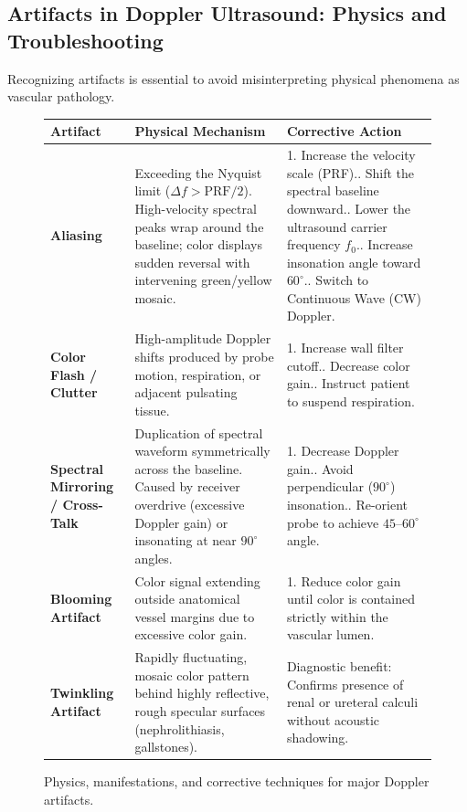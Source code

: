 \documentclass[11pt,a4paper]{article}
\begin{document}
\subsection{Artifacts in Doppler Ultrasound: Physics and Troubleshooting}

Recognizing artifacts is essential to avoid misinterpreting physical phenomena as vascular pathology.

\begin{figure}[htbp]
\centering
\begin{tabular}{p{3.5cm}p{5.5cm}p{5.5cm}}
\toprule
\textbf{Artifact} & \textbf{Physical Mechanism} & \textbf{Corrective Action} \\
\midrule
\textbf{Aliasing} & Exceeding the Nyquist limit ($\Delta f > \text{PRF}/2$). High-velocity spectral peaks wrap around the baseline; color displays sudden reversal with intervening green/yellow mosaic. & 1. Increase the velocity scale (PRF).\newline 2. Shift the spectral baseline downward.\newline 3. Lower the ultrasound carrier frequency $f_0$.\newline 4. Increase insonation angle toward $60^\circ$.\newline 5. Switch to Continuous Wave (CW) Doppler. \\
\addlinespace
\textbf{Color Flash / Clutter} & High-amplitude Doppler shifts produced by probe motion, respiration, or adjacent pulsating tissue. & 1. Increase wall filter cutoff.\newline 2. Decrease color gain.\newline 3. Instruct patient to suspend respiration. \\
\addlinespace
\textbf{Spectral Mirroring / Cross-Talk} & Duplication of spectral waveform symmetrically across the baseline. Caused by receiver overdrive (excessive Doppler gain) or insonating at near $90^\circ$ angles. & 1. Decrease Doppler gain.\newline 2. Avoid perpendicular ($90^\circ$) insonation.\newline 3. Re-orient probe to achieve $45\text{--}60^\circ$ angle. \\
\addlinespace
\textbf{Blooming Artifact} & Color signal extending outside anatomical vessel margins due to excessive color gain. & 1. Reduce color gain until color is contained strictly within the vascular lumen. \\
\addlinespace
\textbf{Twinkling Artifact} & Rapidly fluctuating, mosaic color pattern behind highly reflective, rough specular surfaces (nephrolithiasis, gallstones). & Diagnostic benefit: Confirms presence of renal or ureteral calculi without acoustic shadowing. \\
\bottomrule
\end{tabular}
\caption{Physics, manifestations, and corrective techniques for major Doppler artifacts.}
\label{tab:doppler_artifacts}
\end{figure}
\end{document}
